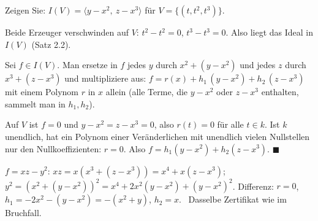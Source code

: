 \begin{aufgabe}
Zeigen Sie: $I(V) = \langle y - x^{2},\ z - x^{3}\rangle$ für $V = \{(t, t^{2}, t^{3})\}$.

\loesung
{}
Beide Erzeuger verschwinden auf $V$: $t^{2} - t^{2} = 0$, $t^{3} - t^{3} = 0$. Also liegt das Ideal in $I(V)$ (Satz 2.2).

Sei $f\in I(V)$. Man ersetze in $f$ jedes $y$ durch $x^{2} + (y - x^{2})$ und jedes $z$ durch $x^{3} + (z - x^{3})$ und multipliziere aus: $f = r(x) + h_1\,(y - x^{2}) + h_2\,(z - x^{3})$ mit einem Polynom $r$ in $x$ allein (alle Terme, die $y - x^{2}$ oder $z - x^{3}$ enthalten, sammelt man in $h_1, h_2$).

Auf $V$ ist $f = 0$ und $y - x^{2} = z - x^{3} = 0$, also $r(t) = 0$ für alle $t\in k$. Ist $k$ unendlich, hat ein Polynom einer Veränderlichen mit unendlich vielen Nullstellen nur den Nullkoeffizienten: $r = 0$. Also $f = h_1(y - x^{2}) + h_2(z - x^{3})$. $\blacksquare$

$f = xz - y^{2}$: $xz = x(x^{3} + (z - x^{3})) = x^{4} + x(z - x^{3})$; $y^{2} = (x^{2} + (y - x^{2}))^{2} = x^{4} + 2x^{2}(y - x^{2}) + (y - x^{2})^{2}$. Differenz: $r = 0$, $h_1 = -2x^{2} - (y - x^{2}) = -(x^{2} + y)$, $h_2 = x$. \checkmark\ Dasselbe Zertifikat wie im Bruchfall.

\begin{center}
\begin{minipage}{0.88\textwidth}
\end{minipage}
\end{center}
\end{aufgabe}

